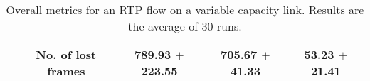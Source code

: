 \begin{table}
{{\begin{tabular}{c c c c c}
  & No. of lost frames & 789.93 $ \pm $ 223.55 & 705.67 $ \pm $ 41.33 & 53.23  $ \pm $ 21.41 \\ \hline
  \end{tabular}
  }}
  \caption{Overall metrics for an RTP flow on a variable capacity link.
  Results are the average of 30 runs.}
  \label{table:fecrc-var-res}
\end{table}





